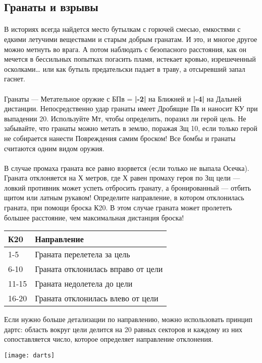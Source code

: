 \subsection{Гранаты и взрывы}
\paragraph{}
В историях всегда найдется место бутылкам с горючей смесью, емкостями с едкими летучими веществами и старым добрым гранатам. И это, и многое другое можно метнуть во врага. А потом наблюдать с безопасного расстояния, как он мечется в бессильных попытках погасить пламя, истекает кровью, изрешеченный осколками… или как бутыль предательски падает в траву, а отсыревший запал гаснет.
\paragraph{}
Гранаты — Метательное оружие с БПв = \textbf{|-2|} на Ближней и \textbf{|-4|} на Дальней дистанции. Непосредственно удар гранаты имеет Дробящие Пв и наносит КУ при выпадении 20. Используйте Мт, чтобы определить, поразил ли герой цель. Не забывайте, что гранаты можно метать в землю, поражая Зщ 10, если только герой не собирается нанести Повреждения самим броском!
\newline
Все бомбы и гранаты считаются одним видом оружия.
\paragraph{}
В случае промаха граната все равно взорвется (если только не выпала Осечка). Граната отклоняется на Х метров, где Х равен промаху героя по Зщ цели — ловкий противник может успеть отбросить гранату, а бронированный — отбить щитом или латным рукавом! Определите направление, в котором отклонилась граната, при помощи броска К20. В этом случае граната может пролететь большее расстояние, чем максимальная дистанция броска!
\begin{center}
\begin{tabular}{ |p{2.7cm}|p{12cm}| }
\hline
\textbf{К20} & \textbf{Направление}
\\ \hline
1-5 & Граната перелетела за цель
\\ \hline
6-10 & Граната отклонилась вправо от цели
\\ \hline
11-15 & Граната недолетела до цели
\\ \hline
16-20 & Граната отклонилась влево от цели
\\ \hline
\end{tabular}
\end{center}
\begin{tcolorbox}
Если нужно больше детализации по направлению, можно использовать принцип дартс: область вокруг цели делится на 20 равных секторов и каждому из них сопоставляется число, которое определяет направление отклонения.
\newline
\begin{center}
\texttt{[image: darts]}
\end{center}
\end{tcolorbox}
